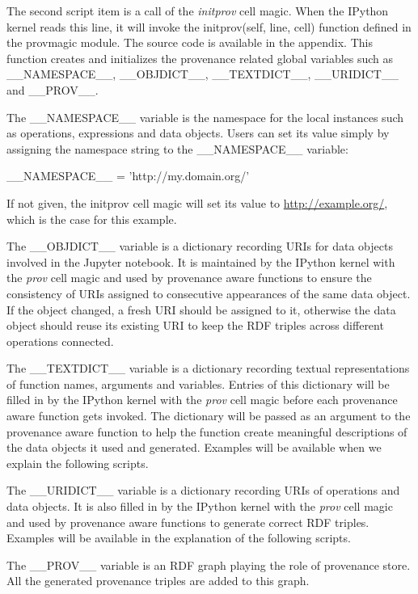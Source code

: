 The second script item is a call of the \emph{initprov} cell magic. When the IPython kernel reads this line, it will invoke the initprov(self, line, cell) function defined in the provmagic module. The source code is available in the appendix. This function creates and initializes the provenance related global variables such as \_\_NAMESPACE\_\_, \_\_OBJDICT\_\_, \_\_TEXTDICT\_\_, \_\_URIDICT\_\_ and \_\_PROV\_\_. 

The \_\_NAMESPACE\_\_ variable is the namespace for the local instances such as operations, expressions and data objects. Users can set its value simply by assigning the namespace string to the \_\_NAMESPACE\_\_ variable:

\_\_NAMESPACE\_\_ = 'http://my.domain.org/'

If not given, the initprov cell magic will set its value to \url{http://example.org/}, which is the case for this example.

The \_\_OBJDICT\_\_ variable is a dictionary recording URIs for data objects involved in the Jupyter notebook. It is maintained by the IPython kernel with the \emph{prov} cell magic and used by provenance aware functions to ensure the consistency of URIs assigned to consecutive appearances of the same data object. If the object changed, a fresh URI should be assigned to it, otherwise the data object should reuse its existing URI to keep the RDF triples across different operations connected.

The \_\_TEXTDICT\_\_ variable is a dictionary recording textual representations of function names, arguments and variables. Entries of this dictionary will be filled in by the IPython kernel with the \emph{prov} cell magic before each provenance aware function gets invoked. The dictionary will be passed as an argument to the provenance aware function to help the function create meaningful descriptions of the data objects it used and generated. Examples will be available when we explain the following scripts.

The \_\_URIDICT\_\_ variable is a dictionary recording URIs of operations and data objects. It is also filled in by the IPython kernel with the \emph{prov} cell magic and used by provenance aware functions to generate correct RDF triples. Examples will be available in the explanation of the following scripts.

The \_\_PROV\_\_ variable is an RDF graph playing the role of provenance store. All the generated provenance triples are added to this graph.

